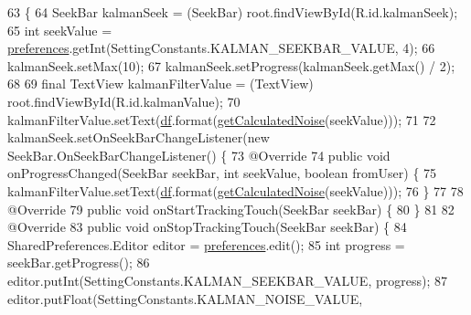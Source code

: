 \begin{DoxyCode}
63                                                    \{
64         SeekBar kalmanSeek = (SeekBar) root.findViewById(R.id.kalmanSeek);
65         \textcolor{keywordtype}{int} seekValue = \hyperlink{classit_1_1unibo_1_1torsello_1_1bluetoothpositioning_1_1fragment_1_1SettingsFragment_a52480c4d5d81ca59fe4a98ae3c623ea4_a52480c4d5d81ca59fe4a98ae3c623ea4}{preferences}.getInt(SettingConstants.KALMAN\_SEEKBAR\_VALUE, 4);
66         kalmanSeek.setMax(10);
67         kalmanSeek.setProgress(kalmanSeek.getMax() / 2);
68 
69         \textcolor{keyword}{final} TextView kalmanFilterValue = (TextView) root.findViewById(R.id.kalmanValue);
70         kalmanFilterValue.setText(\hyperlink{classit_1_1unibo_1_1torsello_1_1bluetoothpositioning_1_1fragment_1_1SettingsFragment_af6b80a700dc80c39a56d001b68a47694_af6b80a700dc80c39a56d001b68a47694}{df}.format(\hyperlink{classit_1_1unibo_1_1torsello_1_1bluetoothpositioning_1_1fragment_1_1SettingsFragment_a595d859602f34ca81957a0578c1602a6_a595d859602f34ca81957a0578c1602a6}{getCalculatedNoise}(seekValue)));
71 
72         kalmanSeek.setOnSeekBarChangeListener(\textcolor{keyword}{new} SeekBar.OnSeekBarChangeListener() \{
73             @Override
74             \textcolor{keyword}{public} \textcolor{keywordtype}{void} onProgressChanged(SeekBar seekBar, \textcolor{keywordtype}{int} seekValue, \textcolor{keywordtype}{boolean} fromUser) \{
75                 kalmanFilterValue.setText(\hyperlink{classit_1_1unibo_1_1torsello_1_1bluetoothpositioning_1_1fragment_1_1SettingsFragment_af6b80a700dc80c39a56d001b68a47694_af6b80a700dc80c39a56d001b68a47694}{df}.format(\hyperlink{classit_1_1unibo_1_1torsello_1_1bluetoothpositioning_1_1fragment_1_1SettingsFragment_a595d859602f34ca81957a0578c1602a6_a595d859602f34ca81957a0578c1602a6}{getCalculatedNoise}(seekValue)));
76             \}
77 
78             @Override
79             \textcolor{keyword}{public} \textcolor{keywordtype}{void} onStartTrackingTouch(SeekBar seekBar) \{
80             \}
81 
82             @Override
83             \textcolor{keyword}{public} \textcolor{keywordtype}{void} onStopTrackingTouch(SeekBar seekBar) \{
84                 SharedPreferences.Editor editor = \hyperlink{classit_1_1unibo_1_1torsello_1_1bluetoothpositioning_1_1fragment_1_1SettingsFragment_a52480c4d5d81ca59fe4a98ae3c623ea4_a52480c4d5d81ca59fe4a98ae3c623ea4}{preferences}.edit();
85                 \textcolor{keywordtype}{int} progress = seekBar.getProgress();
86                 editor.putInt(SettingConstants.KALMAN\_SEEKBAR\_VALUE, progress);
87                 editor.putFloat(SettingConstants.KALMAN\_NOISE\_VALUE, 

\end{DoxyCode}
